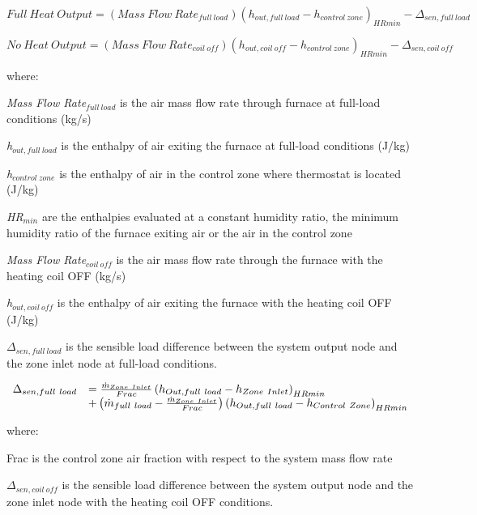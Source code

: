 \begin{equation}
Full~Heat~Output = (Mass~Flow~Rat{e_{full~load}}){({h_{out,full~load}} - {h_{control~zone}})_{HRmin}} - {\Delta_{sen,full~load}}
\end{equation}

\begin{equation}
No~Heat~Output = (Mass~Flow~Rat{e_{coil~off}}){({h_{out,coil~off}} - {h_{control~zone}})_{HRmin}} - {\Delta_{sen,coil~off}}
\end{equation}

where:

\emph{Mass Flow Rate\(_{full~load}\)} is the air mass flow rate through furnace at full-load conditions (kg/s)

\emph{h\(_{out,full~load}\)} is the enthalpy of air exiting the furnace at full-load conditions (J/kg)

\emph{h\(_{control~zone}\)} is the enthalpy of air in the control zone where thermostat is located (J/kg)

\emph{HR\(_{min}\)} are the enthalpies evaluated at a constant humidity ratio, the minimum humidity ratio of the furnace exiting air or the air in the control zone

\emph{Mass Flow Rate\(_{coil~off}\)} is the air mass flow rate through the furnace with the heating coil OFF (kg/s)

\emph{h\(_{out,coil~off}\)} is the enthalpy of air exiting the furnace with the heating coil OFF (J/kg)

\(\Delta_{sen,full~load}\) is the sensible load difference between the system output node and the zone inlet node at full-load conditions.

\begin{equation}
  \begin{array}{rl}
    \Delta_{sen,full~load} &= \frac{\dot{m}_{Zone~Inlet}}{Frac} \left(h_{Out,full~load} - h_{Zone~Inlet}\right)_{HRmin} \\
                           &+ \left(\dot{m}_{full~load} - \frac{\dot{m}_{Zone~Inlet}}{Frac}\right) \left(h_{Out,full~load} - h_{Control~Zone}\right)_{HRmin}
  \end{array}
\end{equation}

where:

Frac is the control zone air fraction with respect to the system mass flow rate

\(\Delta_{sen,coil~off}\) is the sensible load difference between the system output node and the zone inlet node with the heating coil OFF conditions.

